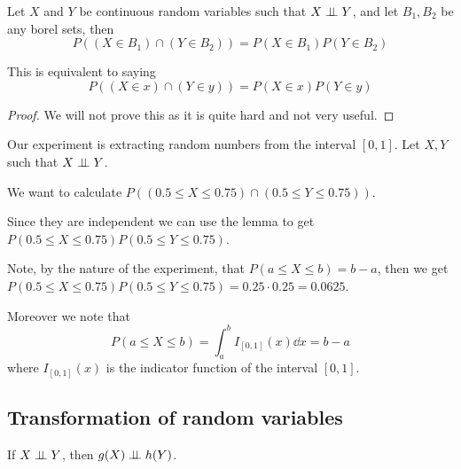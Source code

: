 \documentclass[12pt]{extarticle}
\begin{document}
\begin{lemma}
    \label{lem:independent_random_variables}
    Let $X$ and $Y$ be continuous random variables such that $X \perp \!\!\! \perp Y$, and let $B_1, B_2$ be any borel sets, then
    \begin{equation}
        P\left((X \in B_1) \cap (Y \in B_2)\right) = P(X \in B_1) P(Y \in B_2)
    \end{equation}

    This is equivalent to saying
    \begin{equation}
        P\left((X \in x) \cap (Y \in y)\right) = P(X \in x) P(Y \in y)
    \end{equation}
\end{lemma}

\begin{proof}
    We will not prove this as it is quite hard and not very useful.
\end{proof}

\begin{example}
    Our experiment is extracting random numbers from the interval $[0, 1]$.
    Let $X, Y$ such that $X \perp \!\!\! \perp Y$.

    We want to calculate $P\left((0.5 \leq X \leq 0.75) \cap (0.5 \leq Y \leq 0.75)\right)$.

    Since they are independent we can use the lemma to get $P(0.5 \leq X \leq 0.75) P(0.5 \leq Y \leq 0.75)$.

    Note, by the nature of the experiment, that $P(a \leq X \leq b) = b - a$, then we get
    $P(0.5 \leq X \leq 0.75) P(0.5 \leq Y \leq 0.75) = 0.25 \cdot 0.25 = 0.0625$.

    Moreover we note that
    \begin{equation}
        P(a \leq X \leq b) = \int_a^b I_{[0,1]}(x) \dd{x} = b - a
    \end{equation}
    where $I_{[0,1]}(x)$ is the indicator function of the interval $[0, 1]$.
\end{example}

\subsection{Transformation of random variables}

\begin{proposition}
    \label{prop:transformation_indep_crv}

    If $X \perp \!\!\! \perp Y$, then $g(X) \perp \!\!\! \perp h(Y)$.
\end{proposition}
\end{document}
